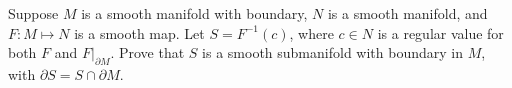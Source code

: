Suppose $M$ is a smooth manifold with boundary, $N$ is a smooth manifold, and $F:M\mapsto N$ is a smooth map.  Let $S=F^{-1}(c)$, where $c \in N$ is a regular value for both $F$ and $F|_{\partial M}$.  Prove that $S$ is a smooth submanifold with boundary in $M$, with $\partial S =S \cap \partial M$.